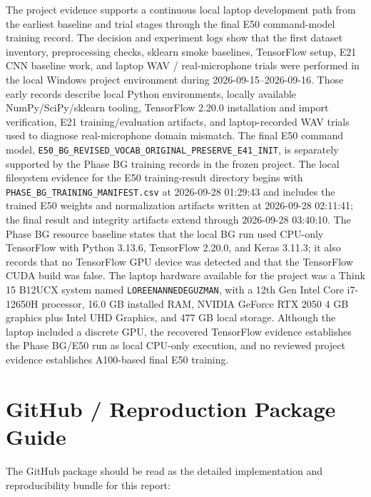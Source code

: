 \documentclass[11pt]{article}
\begin{document}
The project evidence supports a continuous local laptop development path from the earliest baseline and trial stages through the final E50 command-model training record.  The decision and experiment logs show that the first dataset inventory, preprocessing checks, sklearn smoke baselines, TensorFlow setup, E21 CNN baseline work, and laptop WAV / real-microphone trials were performed in the local Windows project environment during 2026-09-15--2026-09-16.  Those early records describe local Python environments, locally available NumPy/SciPy/sklearn tooling, TensorFlow 2.20.0 installation and import verification, E21 training/evaluation artifacts, and laptop-recorded WAV trials used to diagnose real-microphone domain mismatch.  The final E50 command model, \texttt{E50\_BG\_REVISED\_VOCAB\_ORIGINAL\_PRESERVE\_E41\_INIT}, is separately supported by the Phase BG training records in the frozen project.  The local filesystem evidence for the E50 training-result directory begins with \texttt{PHASE\_BG\_TRAINING\_MANIFEST.csv} at 2026-09-28 01:29:43 and includes the trained E50 weights and normalization artifacts written at 2026-09-28 02:11:41; the final result and integrity artifacts extend through 2026-09-28 03:40:10.  The Phase BG resource baseline states that the local BG run used CPU-only TensorFlow with Python 3.13.6, TensorFlow 2.20.0, and Keras 3.11.3; it also records that no TensorFlow GPU device was detected and that the TensorFlow CUDA build was false.  The laptop hardware available for the project was a Think 15 B12UCX system named \texttt{LOREENANNEDEGUZMAN}, with a 12th Gen Intel Core i7-12650H processor, 16.0 GB installed RAM, NVIDIA GeForce RTX 2050 4 GB graphics plus Intel UHD Graphics, and 477 GB local storage.  Although the laptop included a discrete GPU, the recovered TensorFlow evidence establishes the Phase BG/E50 run as local CPU-only execution, and no reviewed project evidence establishes A100-based final E50 training.

\newpage


\section{GitHub / Reproduction Package Guide}
The GitHub package should be read as the detailed implementation and reproducibility bundle for this report:
\end{document}
